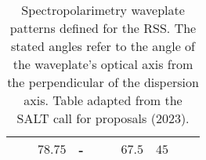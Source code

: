 \begin{table}[t]
\begin{tabular}{cccccccccc}
                                             &                                         & $78.75$                                & -                                         &                                          &        & $67.5$ & $45$   &        &        \\ \hline
    \end{tabular}
    \caption{Spectropolarimetry waveplate patterns defined for the \gls{RSS}. The stated angles refer to the angle of the waveplate's optical axis from the perpendicular of the dispersion axis. Table adapted from the \gls{SALT} call for proposals (2023).}
    \label{table:RSS_specpol_patterns}
\end{table}
